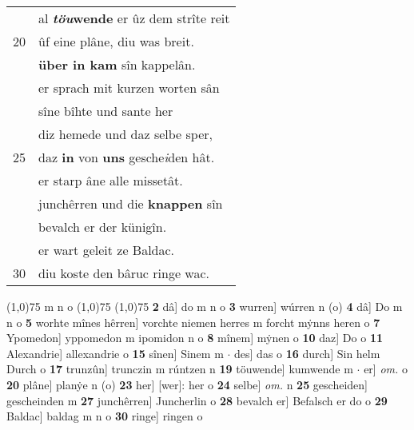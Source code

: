 \documentclass[8pt,a4paper,notitlepage]{article}
\begin{document}
\begin{table}[ht]
\begin{minipage}[t]{0.5\linewidth}
\begin{tabular}{rl}
 & al \textbf{\textit{töu}wende} er ûz dem strîte reit\\ 
20 & ûf eine plâne, diu was breit.\\ 
 & \textbf{über in kam} sîn kappelân.\\ 
 & er sprach mit kurzen worten sân\\ 
 & sîne bîhte und sante her\\ 
 & diz hemede und daz selbe sper,\\ 
25 & daz \textbf{in} von \textbf{uns} gesche\textit{i}den hât.\\ 
 & er starp âne alle missetât.\\ 
 & junchêrren und die \textbf{knappen} sîn\\ 
 & bevalch er der künigîn.\\ 
 & er wart geleit ze Baldac.\\ 
30 & diu koste den bâruc ringe wac.\\ 
\end{tabular}
\scriptsize
\line(1,0){75} \newline
m n o \newline
\line(1,0){75} \newline
\newline
\line(1,0){75} \newline
\textbf{2} dâ] do m n o \textbf{3} wurren] wúrren n (o) \textbf{4} dâ] Do m n o \textbf{5} worhte mînes hêrren] vorchte niemen herres m forcht mẏnns heren o \textbf{7} Ypomedon] yppomedon m ipomidon n o \textbf{8} mînem] mẏnen o \textbf{10} daz] Do o \textbf{11} Alexandrie] allexandrie o \textbf{15} sînen] Sinem m  $\cdot$ des] das o \textbf{16} durch] Sin helm Durch o \textbf{17} trunzûn] trunczin m rúntzen n \textbf{19} töuwende] kumwende m  $\cdot$ er] \textit{om.} o \textbf{20} plâne] planẏe n (o) \textbf{23} her] [wer]: her o \textbf{24} selbe] \textit{om.} n \textbf{25} gescheiden] gescheinden m \textbf{27} junchêrren] Juncherlin o \textbf{28} bevalch er] Befalsch er do o \textbf{29} Baldac] baldag m n o \textbf{30} ringe] ringen o \newline
\end{minipage}
\end{table}
\newpage
\end{document}
